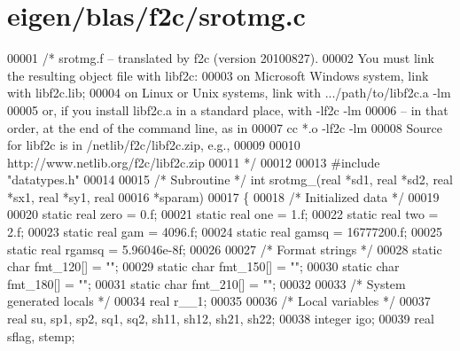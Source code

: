 \hypertarget{eigen_2blas_2f2c_2srotmg_8c_source}{}\section{eigen/blas/f2c/srotmg.c}
\label{eigen_2blas_2f2c_2srotmg_8c_source}

\begin{DoxyCode}
00001 \textcolor{comment}{/* srotmg.f -- translated by f2c (version 20100827).}
00002 \textcolor{comment}{   You must link the resulting object file with libf2c:}
00003 \textcolor{comment}{    on Microsoft Windows system, link with libf2c.lib;}
00004 \textcolor{comment}{    on Linux or Unix systems, link with .../path/to/libf2c.a -lm}
00005 \textcolor{comment}{    or, if you install libf2c.a in a standard place, with -lf2c -lm}
00006 \textcolor{comment}{    -- in that order, at the end of the command line, as in}
00007 \textcolor{comment}{        cc *.o -lf2c -lm}
00008 \textcolor{comment}{    Source for libf2c is in /netlib/f2c/libf2c.zip, e.g.,}
00009 \textcolor{comment}{}
00010 \textcolor{comment}{        http://www.netlib.org/f2c/libf2c.zip}
00011 \textcolor{comment}{*/}
00012 
00013 \textcolor{preprocessor}{#include "datatypes.h"}
00014 
00015 \textcolor{comment}{/* Subroutine */} \textcolor{keywordtype}{int} srotmg\_(real *sd1, real *sd2, real *sx1, real *sy1, real 
00016     *sparam)
00017 \{
00018     \textcolor{comment}{/* Initialized data */}
00019 
00020     \textcolor{keyword}{static} real zero = 0.f;
00021     \textcolor{keyword}{static} real one = 1.f;
00022     \textcolor{keyword}{static} real two = 2.f;
00023     \textcolor{keyword}{static} real gam = 4096.f;
00024     \textcolor{keyword}{static} real gamsq = 16777200.f;
00025     \textcolor{keyword}{static} real rgamsq = 5.96046e-8f;
00026 
00027     \textcolor{comment}{/* Format strings */}
00028     \textcolor{keyword}{static} \textcolor{keywordtype}{char} fmt\_120[] = \textcolor{stringliteral}{""};
00029     \textcolor{keyword}{static} \textcolor{keywordtype}{char} fmt\_150[] = \textcolor{stringliteral}{""};
00030     \textcolor{keyword}{static} \textcolor{keywordtype}{char} fmt\_180[] = \textcolor{stringliteral}{""};
00031     \textcolor{keyword}{static} \textcolor{keywordtype}{char} fmt\_210[] = \textcolor{stringliteral}{""};
00032 
00033     \textcolor{comment}{/* System generated locals */}
00034     real r\_\_1;
00035 
00036     \textcolor{comment}{/* Local variables */}
00037     real su, sp1, sp2, sq1, sq2, sh11, sh12, sh21, sh22;
00038     integer igo;
00039     real sflag, stemp;

\end{DoxyCode}
